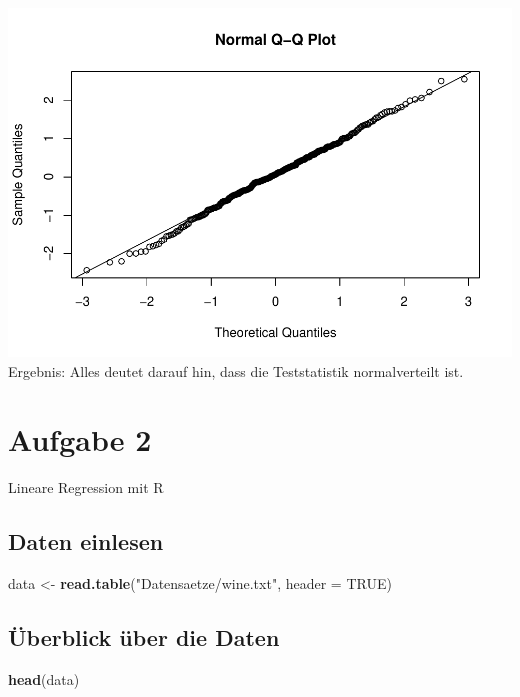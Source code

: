 \documentclass[]{article}
\newenvironment{Shaded}{\begin{snugshade}}{\end{snugshade}}
\newcommand{\DataTypeTok}[1]{\textcolor[rgb]{0.13,0.29,0.53}{#1}}
\newcommand{\KeywordTok}[1]{\textcolor[rgb]{0.13,0.29,0.53}{\textbf{#1}}}
\newcommand{\NormalTok}[1]{#1}
\newcommand{\OtherTok}[1]{\textcolor[rgb]{0.56,0.35,0.01}{#1}}
\newcommand{\StringTok}[1]{\textcolor[rgb]{0.31,0.60,0.02}{#1}}
\begin{document}
\includegraphics{Test_files/figure-latex/unnamed-chunk-10-1.pdf}
Ergebnis: Alles deutet darauf hin, dass die Teststatistik normalverteilt ist.

\hypertarget{aufgabe-2}{%
\section{Aufgabe 2}\label{aufgabe-2}}

Lineare Regression mit R

\hypertarget{daten-einlesen}{%
\subsection{Daten einlesen}\label{daten-einlesen}}

\begin{Shaded}
\begin{Highlighting}[]
\NormalTok{data <-}\StringTok{ }\KeywordTok{read.table}\NormalTok{(}\StringTok{"Datensaetze/wine.txt"}\NormalTok{, }\DataTypeTok{header =} \OtherTok{TRUE}\NormalTok{)}
\end{Highlighting}
\end{Shaded}

\hypertarget{uxfcberblick-uxfcber-die-daten}{%
\subsection{Überblick über die Daten}\label{uxfcberblick-uxfcber-die-daten}}

\begin{Shaded}
\begin{Highlighting}[]
\KeywordTok{head}\NormalTok{(data)}
\end{Highlighting}
\end{Shaded}
\end{document}
